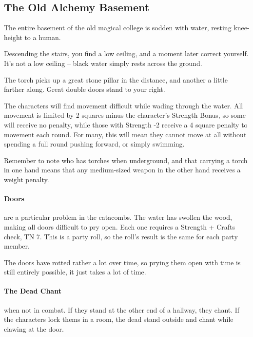 \begin{multicols}{2}
\subsection{The Old Alchemy Basement}\label{old_alchemy_basement}\setcounter{list}{0}

The entire basement of the old magical college is sodden with water, resting knee-height to a human.

\begin{boxtext}
	Descending the stairs, you find a low ceiling, and a moment later correct yourself.  It's not a low ceiling -- black water simply rests across the ground.

	The torch picks up a great stone pillar in the distance, and another a little farther along.  Great double doors stand to your right.

\end{boxtext}

The characters will find movement difficult while wading through the water.  All movement is limited by 2 squares minus the character's Strength Bonus, so some will receive no penalty, while those with Strength -2 receive a 4 square penalty to movement each round.  For many, this will mean they cannot move at all without spending a full round pushing forward, or simply swimming.

Remember to note who has torches when underground, and that carrying a torch in one hand means that any medium-sized weapon in the other hand receives a weight penalty.

\paragraph{Doors} are a particular problem in the catacombs.  The water has swollen the wood, making all doors difficult to pry open.  Each one requires a Strength + Crafts check, TN 7.  This is a party roll, so the roll's result is the same for each party member.

The doors have rotted rather a lot over time, so prying them open with time is still entirely possible, it just takes a lot of time.

\paragraph{The Dead Chant} when not in combat.
If they stand at the other end of a hallway, they chant.
If the characters lock thems in a room, the dead stand outside and chant while clawing at the door.


\end{multicols}
